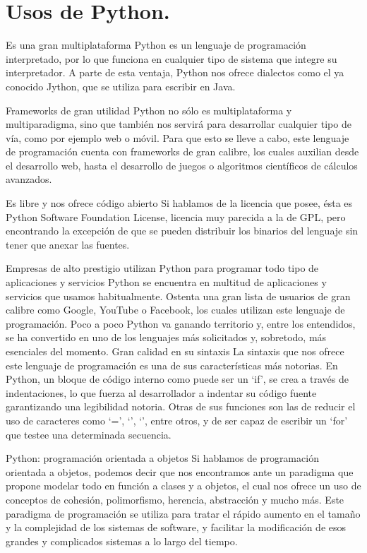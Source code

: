 \documentclass[12pt]{article}
\begin{document}
\section{Usos de Python.}

Es una gran multiplataforma
Python es un lenguaje de programación interpretado, por lo que funciona en cualquier tipo de sistema que integre su interpretador.  A parte de esta ventaja, Python nos ofrece dialectos como el ya conocido Jython, que se utiliza para escribir en Java.
 
Frameworks de gran utilidad
Python no sólo es multiplataforma y multiparadigma, sino que también nos servirá para desarrollar cualquier tipo de vía, como por ejemplo web o móvil. Para que esto se lleve a cabo, este lenguaje de programación cuenta con frameworks de gran calibre, los cuales auxilian desde el desarrollo web, hasta el desarrollo de juegos o algoritmos científicos de cálculos avanzados.
 
Es libre y nos ofrece código abierto
Si hablamos de la licencia que posee, ésta es Python Software Foundation License, licencia muy parecida a la de GPL, pero encontrando la excepción de que se pueden distribuir los binarios del lenguaje sin tener que anexar las fuentes.
 
Empresas de alto prestigio utilizan Python para programar todo tipo de aplicaciones y servicios
Python se encuentra en multitud de aplicaciones y servicios que usamos habitualmente. Ostenta una gran lista de usuarios de gran calibre como Google, YouTube o Facebook, los cuales utilizan este lenguaje de programación. Poco a poco Python va ganando territorio y, entre los entendidos, se ha convertido en uno de los lenguajes más solicitados y, sobretodo, más esenciales del momento. 
Gran calidad en su sintaxis
La sintaxis que nos ofrece este lenguaje de programación es una de sus características más notorias. En Python, un bloque de código interno como puede ser un ‘if’, se crea a través de indentaciones, lo que fuerza al desarrollador a indentar su código fuente garantizando una legibilidad notoria.
Otras de sus funciones son las de reducir el uso de caracteres como ‘=’, ‘{’, ‘}’, entre otros, y de ser capaz de escribir un ‘for’ que testee una determinada secuencia.
 
Python: programación orientada a objetos
Si hablamos de programación orientada a objetos, podemos decir que nos encontramos ante un paradigma que propone modelar todo en función a clases y a objetos, el cual nos ofrece un uso de conceptos de cohesión, polimorfismo, herencia, abstracción y mucho más.
Este paradigma de programación se utiliza para tratar el rápido aumento en el tamaño y la complejidad de los sistemas de software, y facilitar la modificación de esos grandes y complicados sistemas a lo largo del tiempo.
 
\end{document}
